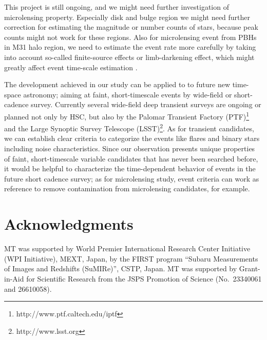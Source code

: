 \documentclass[iop, apj]{emulateapj}
\newcommand{\?}{\stackrel{?}{=}}
\begin{document}
This project is still ongoing, and we might need further investigation of microlensing property. 
Especially disk and bulge region we might need further correction for  
estimating the magnitude or number counts of stars, 
because peak counts might not work for these regions. 
Also for microlensing event from PBHs in M31 halo region, 
we need to estimate the event rate more carefully by taking into account 
so-called finite-source effects or limb-darkening effect, 
which might greatly affect event time-scale estimation \citep[see][for the detail]{Riffeseretal:08}. 


The development achieved in our study can be applied to 
to future new time-space astronomy; aiming at faint, short-timescale events by 
wide-field or short-cadence survey. 
Currently several wide-field deep transient surveys are ongoing or planned not only by HSC, but also by 
the Palomar Transient Factory (PTF)\footnote{http://www.ptf.caltech.edu/iptf} and 
the Large Synoptic Survey Telescope (LSST)\footnote{http://www.lsst.org}. 
As for transient candidates, we can establish clear criteria 
to categorize the events like flares and binary stars including noise characteristics.  
Since our observation presents unique properties of faint, short-timescale variable candidates  
that has never been searched before, 
it would be helpful to characterize the time-dependent behavior of events 
in the future short cadence survey; 
as for microlensing study, event criteria can work as reference to 
remove contamination from microlensing candidates, for example. 

\section*{Acknowledgments}

MT was supported by World Premier International Research Center
Initiative (WPI Initiative), MEXT, Japan, by the FIRST program ``Subaru
Measurements of Images and Redshifts (SuMIRe)'', CSTP, Japan. MT was supported 
by Grant-in-Aid for Scientific Research from the JSPS Promotion of Science
(No.~23340061 and 26610058). 



\end{document}
